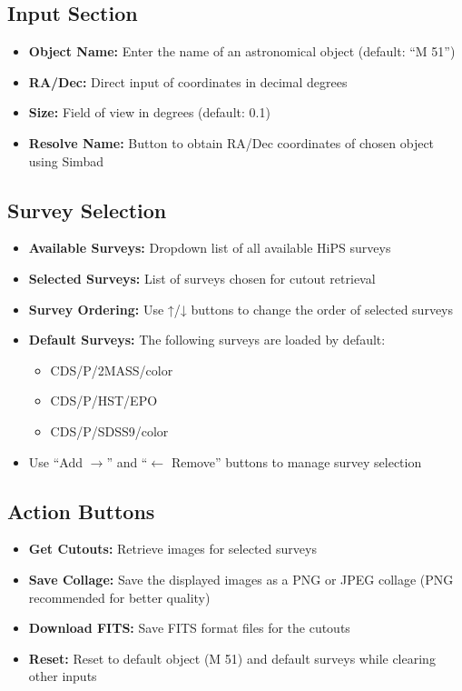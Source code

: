 \documentclass{article}
\begin{document}
\subsection{Input Section}
\begin{itemize}
    \item \textbf{Object Name:} Enter the name of an astronomical object (default: ``M 51'')
    \item \textbf{RA/Dec:} Direct input of coordinates in decimal degrees
    \item \textbf{Size:} Field of view in degrees (default: 0.1)
    \item \textbf{Resolve Name:} Button to obtain RA/Dec coordinates of chosen object using Simbad
\end{itemize}

\subsection{Survey Selection}
\begin{itemize}
    \item \textbf{Available Surveys:} Dropdown list of all available HiPS surveys
    \item \textbf{Selected Surveys:} List of surveys chosen for cutout retrieval
    \item \textbf{Survey Ordering:} Use ↑/↓ buttons to change the order of selected surveys
    \item \textbf{Default Surveys:} The following surveys are loaded by default:
        \begin{itemize}
            \item CDS/P/2MASS/color
            \item CDS/P/HST/EPO
            \item CDS/P/SDSS9/color
        \end{itemize}
    \item Use ``Add $\rightarrow$'' and ``$\leftarrow$ Remove'' buttons to manage survey selection
\end{itemize}

\subsection{Action Buttons}
\begin{itemize}
    \item \textbf{Get Cutouts:} Retrieve images for selected surveys
    \item \textbf{Save Collage:} Save the displayed images as a PNG or JPEG collage (PNG recommended for better quality)
    \item \textbf{Download FITS:} Save FITS format files for the cutouts
    \item \textbf{Reset:} Reset to default object (M 51) and default surveys while clearing other inputs
\end{itemize}
\end{document}
